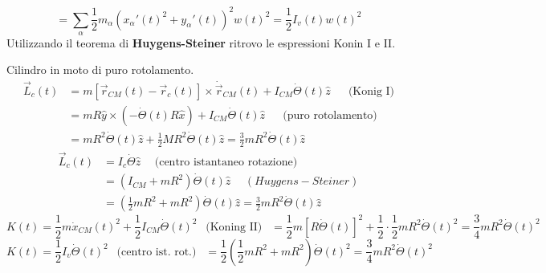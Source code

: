 $$= \sum_{\alpha}\frac{1}{2}m_{\alpha}(x_{\alpha}'(t)^2 + y_{\alpha}'(t))^2 w(t)^2 = \frac{1}{2}I_v(t)w(t)^2$$
Utilizzando il teorema di \textbf{Huygens-Steiner} ritrovo le espressioni Konin I e II.
\begin{example}
    Cilindro in moto di puro rotolamento.
    \begin{equation*}
        \begin{split}
            \vec{L}_c(t) & = m[\vec{r}_{CM}(t) - \vec{r}_c(t)] \times \dot{\vec{r}}_{CM}(t) + I_{CM}\dot{\Theta}(t)\hat{z} \hspace{15pt}\text{ (Konig I)}\\
                         & = mR\hat{y} \times (-\dot{\Theta}(t)R \hat{x}) + I_{CM}\dot{\Theta}(t)\hat{z} \hspace{15pt}\text{ (puro rotolamento)}\\
                         & = mR^2\dot{\Theta}(t)\hat{z} + \frac{1}{2}MR^2\dot{\Theta}(t)\hat{z} = \frac{3}{2}mR^2\dot{\Theta}(t)\hat{z}
        \end{split}
    \end{equation*}
    \begin{equation*}
        \begin{split}
            \vec{L}_c(t) & = I_c\dot{\Theta}\hat{z} \hspace{15pt}\text{(centro istantaneo rotazione)}\\
                         & = (I_{CM} + mR^2) \dot{\Theta}(t)\hat{z} \hspace{15pt} (Huygens-Steiner)\\
                         & = (\frac{1}{2}mR^2 + mR^2)\dot{\Theta}(t)\hat{z} = \frac{3}{2}mR^2\dot{\Theta}(t)\hat{z}
        \end{split}
    \end{equation*}
    $$K(t) = \frac{1}{2}m\dot{x}_{CM}(t)^2 + \frac{1}{2}I_{CM}\dot{\Theta}(t)^2 \:\:\text{ (Koning II) }\:\: = \frac{1}{2}m[R\dot{\Theta}(t)]^2 + \frac{1}{2} \cdot \frac{1}{2}mR^2\dot{\Theta}(t)^2 = \frac{3}{4}mR^2\dot{\Theta}(t)^2$$
    $$K(t) = \frac{1}{2}I_v\dot{\Theta}(t)^2 \:\:\text{ (centro ist. rot.) }\:\: = \frac{1}{2}(\frac{1}{2}mR^2 + mR^2)\dot{\Theta}(t)^2 = \frac{3}{4}mR^2\dot{\Theta}(t)^2$$
\end{example}

